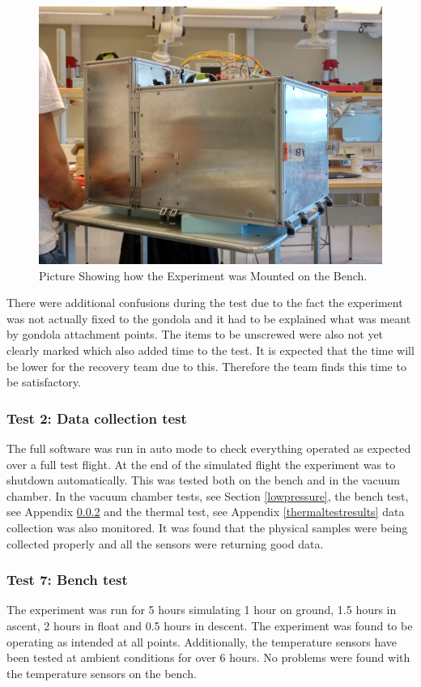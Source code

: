 \documentclass[a4paper,12pt,oneside]{article}
\begin{document}
\begin{appendices}
\begin{figure}[H]
    \centering
    \includegraphics[width=0.4\linewidth]{appendix/img/test-results/fully-attached.jpg}
    \caption{Picture Showing how the Experiment was Mounted on the Bench.}
    \label{fig:structure-test}
\end{figure}

There were additional confusions during the test due to the fact the experiment was not actually fixed to the gondola and it had to be explained what was meant by gondola attachment points. The items to be unscrewed were also not yet clearly marked which also added time to the test. It is expected that the time will be lower for the recovery team due to this. Therefore the team finds this time to be satisfactory.


\subsubsection{Test 2: Data collection test}
The full software was run in auto mode to check everything operated as expected over a full test flight. At the end of the simulated flight the experiment was to shutdown automatically. This was tested both on the bench and in the vacuum chamber. In the vacuum chamber tests, see Section \ref{lowpressure}, the bench test, see Appendix \ref{benchtest} and the thermal test, see Appendix \ref{thermaltestresults} data collection was also monitored. It was found that the physical samples were being collected properly and all the sensors were returning good data.

\subsubsection{Test 7: Bench test}\label{benchtest}
The experiment was run for 5 hours simulating 1 hour on ground, 1.5 hours in ascent, 2 hours in float and 0.5 hours in descent. The experiment was found to be operating as intended at all points. Additionally, the temperature sensors have been tested at ambient conditions for over 6 hours. No problems were found with the temperature sensors on the bench.


\end{appendices}
\end{document}
